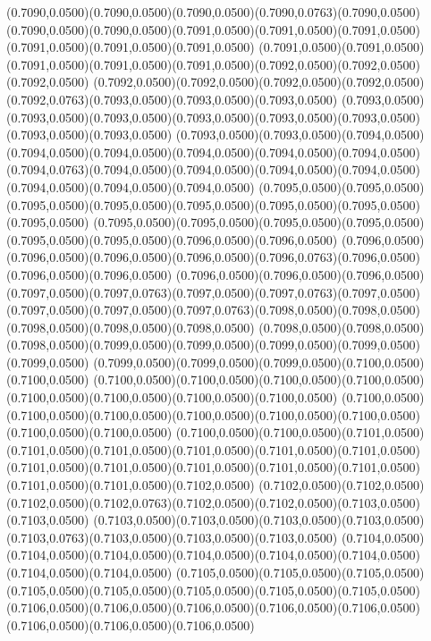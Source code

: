 (0.7090,0.0500)(0.7090,0.0500)(0.7090,0.0500)(0.7090,0.0763)(0.7090,0.0500)
\PST@Solid(0.7090,0.0500)(0.7090,0.0500)(0.7091,0.0500)(0.7091,0.0500)(0.7091,0.0500)(0.7091,0.0500)(0.7091,0.0500)(0.7091,0.0500)
(0.7091,0.0500)(0.7091,0.0500)(0.7091,0.0500)(0.7091,0.0500)(0.7091,0.0500)(0.7092,0.0500)(0.7092,0.0500)(0.7092,0.0500)
(0.7092,0.0500)(0.7092,0.0500)(0.7092,0.0500)(0.7092,0.0500)(0.7092,0.0763)(0.7093,0.0500)(0.7093,0.0500)(0.7093,0.0500)
(0.7093,0.0500)(0.7093,0.0500)(0.7093,0.0500)(0.7093,0.0500)(0.7093,0.0500)(0.7093,0.0500)(0.7093,0.0500)(0.7093,0.0500)
(0.7093,0.0500)(0.7093,0.0500)(0.7094,0.0500)(0.7094,0.0500)(0.7094,0.0500)(0.7094,0.0500)(0.7094,0.0500)(0.7094,0.0500)
(0.7094,0.0763)(0.7094,0.0500)(0.7094,0.0500)(0.7094,0.0500)(0.7094,0.0500)(0.7094,0.0500)(0.7094,0.0500)(0.7094,0.0500)
(0.7095,0.0500)(0.7095,0.0500)(0.7095,0.0500)(0.7095,0.0500)(0.7095,0.0500)(0.7095,0.0500)(0.7095,0.0500)(0.7095,0.0500)
(0.7095,0.0500)(0.7095,0.0500)(0.7095,0.0500)(0.7095,0.0500)(0.7095,0.0500)(0.7095,0.0500)(0.7096,0.0500)(0.7096,0.0500)
(0.7096,0.0500)(0.7096,0.0500)(0.7096,0.0500)(0.7096,0.0500)(0.7096,0.0763)(0.7096,0.0500)(0.7096,0.0500)(0.7096,0.0500)
(0.7096,0.0500)(0.7096,0.0500)(0.7096,0.0500)(0.7097,0.0500)(0.7097,0.0763)(0.7097,0.0500)(0.7097,0.0763)(0.7097,0.0500)
(0.7097,0.0500)(0.7097,0.0500)(0.7097,0.0763)(0.7098,0.0500)(0.7098,0.0500)(0.7098,0.0500)(0.7098,0.0500)(0.7098,0.0500)
(0.7098,0.0500)(0.7098,0.0500)(0.7098,0.0500)(0.7099,0.0500)(0.7099,0.0500)(0.7099,0.0500)(0.7099,0.0500)(0.7099,0.0500)
(0.7099,0.0500)(0.7099,0.0500)(0.7099,0.0500)(0.7100,0.0500)(0.7100,0.0500)
\PST@Solid(0.7100,0.0500)(0.7100,0.0500)(0.7100,0.0500)(0.7100,0.0500)(0.7100,0.0500)(0.7100,0.0500)(0.7100,0.0500)(0.7100,0.0500)
(0.7100,0.0500)(0.7100,0.0500)(0.7100,0.0500)(0.7100,0.0500)(0.7100,0.0500)(0.7100,0.0500)(0.7100,0.0500)(0.7100,0.0500)
(0.7100,0.0500)(0.7100,0.0500)(0.7101,0.0500)(0.7101,0.0500)(0.7101,0.0500)(0.7101,0.0500)(0.7101,0.0500)(0.7101,0.0500)
(0.7101,0.0500)(0.7101,0.0500)(0.7101,0.0500)(0.7101,0.0500)(0.7101,0.0500)(0.7101,0.0500)(0.7101,0.0500)(0.7102,0.0500)
(0.7102,0.0500)(0.7102,0.0500)(0.7102,0.0500)(0.7102,0.0763)(0.7102,0.0500)(0.7102,0.0500)(0.7103,0.0500)(0.7103,0.0500)
(0.7103,0.0500)(0.7103,0.0500)(0.7103,0.0500)(0.7103,0.0500)(0.7103,0.0763)(0.7103,0.0500)(0.7103,0.0500)(0.7103,0.0500)
(0.7104,0.0500)(0.7104,0.0500)(0.7104,0.0500)(0.7104,0.0500)(0.7104,0.0500)(0.7104,0.0500)(0.7104,0.0500)(0.7104,0.0500)
(0.7105,0.0500)(0.7105,0.0500)(0.7105,0.0500)(0.7105,0.0500)(0.7105,0.0500)(0.7105,0.0500)(0.7105,0.0500)(0.7105,0.0500)
(0.7106,0.0500)(0.7106,0.0500)(0.7106,0.0500)(0.7106,0.0500)(0.7106,0.0500)(0.7106,0.0500)(0.7106,0.0500)(0.7106,0.0500)
